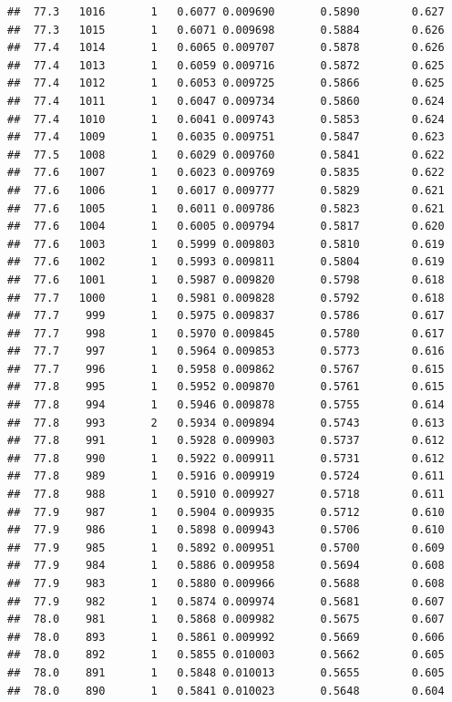 \documentclass[
]{book}
\begin{document}
\begin{verbatim}
##  77.3   1016       1   0.6077 0.009690       0.5890        0.627
##  77.3   1015       1   0.6071 0.009698       0.5884        0.626
##  77.4   1014       1   0.6065 0.009707       0.5878        0.626
##  77.4   1013       1   0.6059 0.009716       0.5872        0.625
##  77.4   1012       1   0.6053 0.009725       0.5866        0.625
##  77.4   1011       1   0.6047 0.009734       0.5860        0.624
##  77.4   1010       1   0.6041 0.009743       0.5853        0.624
##  77.4   1009       1   0.6035 0.009751       0.5847        0.623
##  77.5   1008       1   0.6029 0.009760       0.5841        0.622
##  77.6   1007       1   0.6023 0.009769       0.5835        0.622
##  77.6   1006       1   0.6017 0.009777       0.5829        0.621
##  77.6   1005       1   0.6011 0.009786       0.5823        0.621
##  77.6   1004       1   0.6005 0.009794       0.5817        0.620
##  77.6   1003       1   0.5999 0.009803       0.5810        0.619
##  77.6   1002       1   0.5993 0.009811       0.5804        0.619
##  77.6   1001       1   0.5987 0.009820       0.5798        0.618
##  77.7   1000       1   0.5981 0.009828       0.5792        0.618
##  77.7    999       1   0.5975 0.009837       0.5786        0.617
##  77.7    998       1   0.5970 0.009845       0.5780        0.617
##  77.7    997       1   0.5964 0.009853       0.5773        0.616
##  77.7    996       1   0.5958 0.009862       0.5767        0.615
##  77.8    995       1   0.5952 0.009870       0.5761        0.615
##  77.8    994       1   0.5946 0.009878       0.5755        0.614
##  77.8    993       2   0.5934 0.009894       0.5743        0.613
##  77.8    991       1   0.5928 0.009903       0.5737        0.612
##  77.8    990       1   0.5922 0.009911       0.5731        0.612
##  77.8    989       1   0.5916 0.009919       0.5724        0.611
##  77.8    988       1   0.5910 0.009927       0.5718        0.611
##  77.9    987       1   0.5904 0.009935       0.5712        0.610
##  77.9    986       1   0.5898 0.009943       0.5706        0.610
##  77.9    985       1   0.5892 0.009951       0.5700        0.609
##  77.9    984       1   0.5886 0.009958       0.5694        0.608
##  77.9    983       1   0.5880 0.009966       0.5688        0.608
##  77.9    982       1   0.5874 0.009974       0.5681        0.607
##  78.0    981       1   0.5868 0.009982       0.5675        0.607
##  78.0    893       1   0.5861 0.009992       0.5669        0.606
##  78.0    892       1   0.5855 0.010003       0.5662        0.605
##  78.0    891       1   0.5848 0.010013       0.5655        0.605
##  78.0    890       1   0.5841 0.010023       0.5648        0.604

\end{verbatim}
\end{document}
